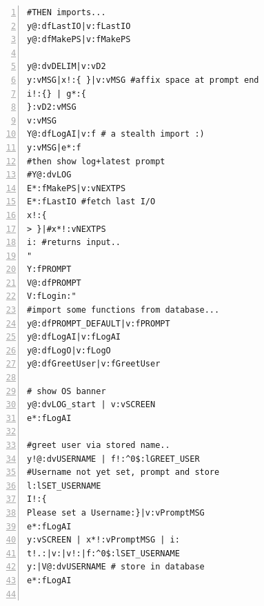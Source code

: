 \documentclass[a4paper, 18pt]{book} %
\begin{document}
{\begin{lstlisting}[style=tea,caption=TEA Program: TOS v1.1.0 Complete Source-Code (SANITIZED form), label=LST3,breaklines=true,numbers=left]
#THEN imports...
y@:dfLastIO|v:fLastIO
y@:dfMakePS|v:fMakePS

y@:dvDELIM|v:vD2
y:vMSG|x!:{ }|v:vMSG #affix space at prompt end
i!:{} | g*:{
}:vD2:vMSG
v:vMSG
Y@:dfLogAI|v:f # a stealth import :)
y:vMSG|e*:f
#then show log+latest prompt
#Y@:dvLOG
E*:fMakePS|v:vNEXTPS
E*:fLastIO #fetch last I/O
x!:{
> }|#x*!:vNEXTPS
i: #returns input..
"
Y:fPROMPT
V@:dfPROMPT
V:fLogin:"
#import some functions from database...
y@:dfPROMPT_DEFAULT|v:fPROMPT
y@:dfLogAI|v:fLogAI
y@:dfLogO|v:fLogO
y@:dfGreetUser|v:fGreetUser

# show OS banner
y@:dvLOG_start | v:vSCREEN
e*:fLogAI

#greet user via stored name..
y!@:dvUSERNAME | f!:^0$:lGREET_USER
#Username not yet set, prompt and store
l:lSET_USERNAME
I!:{
Please set a Username:}|v:vPromptMSG
e*:fLogAI
y:vSCREEN | x*!:vPromptMSG | i:
t!.:|v:|v!:|f:^0$:lSET_USERNAME
y:|V@:dvUSERNAME # store in database
e*:fLogAI


\end{lstlisting}}
\end{document}
